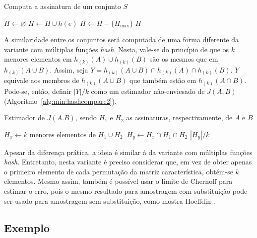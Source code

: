 \begin{algorithm}
\linespread{1}\selectfont
\caption{Computa a assinatura de um conjunto $S$}
\label{alg:min:hashcompute2}
\begin{algorithmic}[1]
    \State $H \gets \varnothing$
        \State $H \gets H \cup h(e)$
            \State $H \gets H - \{H_{\max}\}$
        \EndIf
    \EndFor
	\Return $H$
\EndFunction
\end{algorithmic}
\end{algorithm}

A similaridade entre os conjuntos será computada de uma forma diferente da variante com múltiplas funções \emph{hash}. Nesta, vale-se do princípio de que os $k$ menores elementos em $h_{(k)}(A) \cup h_{(k)}(B)$ são os mesmos que em $h_{(k)}(A \cup B)$. Assim, seja $Y = h_{(k)}(A \cup B) \cap h_{(k)}(A) \cap h_{(k)}(B)$.  $Y$ equivale aos membros de $h_{(k)}(A \cup B)$ que também estão em $ h_{(k)}(A \cap B)$. Pode-se, então, definir $|Y|/k$ como um estimador não-enviesado de $J(A, B)$ (Algoritmo~\ref{alg:min:hashcompare2}).

\begin{algorithm}
\linespread{1}\selectfont
\caption{Estimador de $J(A. B)$, sendo $H_1$ e $H_2$ as assinaturas, respectivamente, de $A$ e $B$}
\label{alg:min:hashcompare2}
\begin{algorithmic}[1]
    \State $H_x \gets k \text{ menores elementos de } H_1 \cup H_2 \ $
    \State $H_y \gets H_x \cap H_1 \cap H_2 $
	\Return $|H_y|/k$
\EndFunction
\end{algorithmic}
\end{algorithm}

Apesar da diferença prática, a ideia é similar à da variante com múltiplas funções \emph{hash}. Entretanto, nesta variante é preciso considerar que, em vez de obter apenas o primeiro elemento de cada permutação da matriz característica, obtém-se $k$ elementos. Mesmo assim, também é possível usar o limite de Chernoff para estimar o erro, pois o mesmo resultado para amostragem com substituição pode ser usado para amostragem sem substituição, como mostra Hoeffdin \cite{hoeffding1963probability,bardenet2015concentration}.

\subsection{Exemplo}\label{sec:minhash:example}

